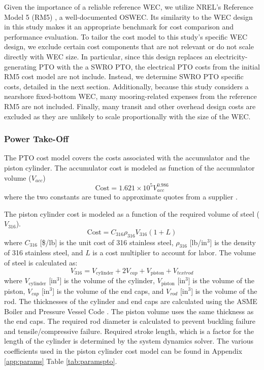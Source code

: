 \documentclass[twocolumn,10pt]{asme2e}
\begin{document}
Given the importance of a reliable reference WEC, we utilize NREL’s Reference Model 5 (RM5) \cite{rm5}, a well-documented OSWEC. Its similarity to the WEC design in this study makes it an appropriate benchmark for cost comparison and performance evaluation. To tailor the cost model to this study’s specific WEC design, we exclude certain cost components that are not relevant or do not scale directly with WEC size. In particular, since this design replaces an electricity-generating PTO with the a SWRO PTO, the electrical PTO costs from the initial RM5 cost model are not include. Instead, we determine SWRO PTO specific costs, detailed in the next section. Additionally, because this study considers a nearshore fixed-bottom WEC, many mooring-related expenses from the reference RM5 are not included. Finally, many transit and other overhead design costs are excluded as they are unlikely to scale proportionally with the size of the WEC. 

\subsubsection{Power Take-Off}

The PTO cost model covers the costs associated with the accumulator and the piston cylinder. The accumulator cost is modeled as function of the accumulator volume ($V_{acc}$)
\begin{equation}
    \text{Cost} = 1.621 \times 10^5 V_{acc} ^{0.986}
\end{equation}
where the two constants are tuned to approximate quotes from a supplier \cite{reasontek}. 

The piston cylinder cost is modeled as a function of the required volume of steel ($V_{\text{316}}$). 
\begin{equation}
    \text{Cost} = C_{\text{316}} \rho_{\text{316}} V_{\text{316}} (1+L)
\end{equation}
where $C_{\text{316}}$ [\$/lb] is the unit cost of 316 stainless steel, $\rho_{\text{316}}$ [lb/in$^3$] is the density of 316 stainless steel, and $L$ is a cost multiplier to account for labor. The volume of steel is calculated as:
\begin{equation}
    V_{\text{316}} = V_{\text{cylinder}} + 2V_{cap} + V_{\text{piston}} + V_{text{rod}}
\end{equation}
where $V_{\text{cylinder}}$ [in$^3$] is the volume of the cylinder, $V_{\text{piston}}$ [in$^3$] is the volume of the piston, $V_{cap}$ [in$^3$] is the volume of the end caps, and $V_{rod}$ [in$^3$] is the volume of the rod. The thicknesses of the cylinder and end caps are calculated using the ASME Boiler and Pressure Vessel Code \cite{ASME_BPVC}. The piston volume uses the same thickness as the end caps. The required rod diameter is calculated to prevent buckling failure and tensile/compressive failure. Required stroke length, which is a factor for the length of the cylinder is determined by the system dynamics solver. The various coefficients used in the piston cylinder cost model can be found in Appendix \ref{app:params} Table \ref{tab:paramspto}.
\end{document}
